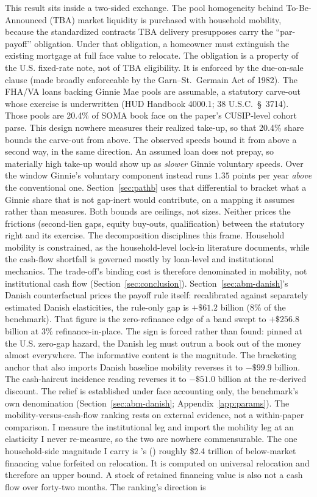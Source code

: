 \documentclass[12pt]{article}
\newcommand{\citepos}[1]{\citeauthor{#1}'s (\citeyear{#1})}
\begin{document}
This result sits inside a two-sided exchange. The pool homogeneity behind To-Be-Announced (TBA) market liquidity \citep[the market's institutional design is reviewed in][]{fuster2023} is purchased with household mobility, because the standardized contracts TBA delivery presupposes carry the ``par-payoff'' obligation. Under that obligation, a homeowner must extinguish the existing mortgage at full face value to relocate. The obligation is a property of the U.S. fixed-rate note, not of TBA eligibility. It is enforced by the due-on-sale clause (made broadly enforceable by the Garn--St.~Germain Act of 1982). The FHA/VA loans backing Ginnie Mae pools are assumable, a statutory carve-out whose exercise is underwritten (HUD Handbook 4000.1; 38 U.S.C.~\S~3714). Those pools are 20.4\% of SOMA book face on the paper's CUSIP-level cohort parse. This design nowhere measures their realized take-up, so that 20.4\% share bounds the carve-out from above. The observed speeds bound it from above a second way, in the same direction. An assumed loan does not prepay, so materially high take-up would show up as \emph{slower} Ginnie voluntary speeds. Over the window Ginnie's voluntary component instead runs $1.35$ points per year \emph{above} the conventional one. Section~\ref{sec:pathb} uses that differential to bracket what a Ginnie share that is not gap-inert would contribute, on a mapping it assumes rather than measures. Both bounds are ceilings, not sizes. Neither prices the frictions (second-lien gaps, equity buy-outs, qualification) between the statutory right and its exercise. The decomposition disciplines this frame. Household mobility is constrained, as the household-level lock-in literature documents, while the cash-flow shortfall is governed mostly by loan-level and institutional mechanics. The trade-off's binding cost is therefore denominated in mobility, not institutional cash flow (Section~\ref{sec:conclusion}). Section~\ref{sec:abm-danish}'s Danish counterfactual prices the payoff rule itself: recalibrated against separately estimated Danish elasticities, the rule-only gap is $+\$61.2$ billion (8\% of the benchmark). That figure is the zero-refinance edge of a band swept to $+\$256.8$ billion at 3\% refinance-in-place. The sign is forced rather than found: pinned at the U.S. zero-gap hazard, the Danish leg must outrun a book out of the money almost everywhere. The informative content is the magnitude. The bracketing anchor that also imports Danish baseline mobility reverses it to $-\$99.9$ billion. The cash-haircut incidence reading reverses it to $-\$51.0$ billion at the re-derived discount. The relief is established under face accounting only, the benchmark's own denomination (Section~\ref{sec:abm-danish}; Appendix~\ref{app:params}). The mobility-versus-cash-flow ranking rests on external evidence, not a within-paper comparison. I measure the institutional leg and import the mobility leg at an elasticity I never re-measure, so the two are nowhere commensurable. The one household-side magnitude I carry is \citepos{batzer2024} roughly \$2.4 trillion of below-market financing value forfeited on relocation. It is computed on universal relocation and therefore an upper bound. A stock of retained financing value is also not a cash flow over forty-two months. The ranking's direction is 
\end{document}
